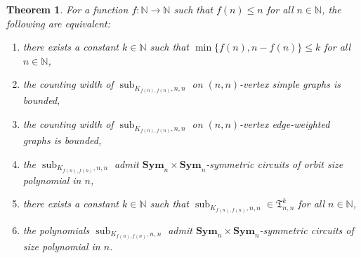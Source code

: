 \documentclass[10pt,a4paper]{article}
\theoremstyle{definition}
\theoremstyle{plain}
\newtheorem{theorem}[definition]{Theorem}
\theoremstyle{remark}
\DeclareMathOperator{\sub}{sub}
\newcommand{\Sym}{\mathbf{Sym}}
\begin{document}
	\begin{theorem}\label{thm:knn}
		For a function $f \colon \mathbb{N} \to \mathbb{N}$ such that $f(n) \leq n$ for all $n \in \mathbb{N}$,
		the following are equivalent:
		\begin{enumerate}
			\item there exists a constant $k \in \mathbb{N}$ such that $\min\{f(n), n- f(n)\} \leq k$ for all $n \in \mathbb{N}$,\label{it:knn1}
			\item the counting width of $\sub_{K_{f(n), f(n)}, n,n}$ on $(n,n)$-vertex simple graphs is bounded,\label{it:knn2}
			\item the counting width of $\sub_{K_{f(n), f(n)}, n,n}$ on $(n,n)$-vertex edge-weighted graphs is bounded,\label{it:knn3}
			\item the $\sub_{K_{f(n), f(n)}, n,n}$ admit $\Sym_n \times \Sym_n$-symmetric circuits of orbit size polynomial in $n$,\label{it:knn4}
			\item there exists a constant $k \in \mathbb{N}$ such that $\sub_{K_{f(n), f(n)}, n,n} \in \mathfrak{T}^k_{n,n}$ for all $n \in \mathbb{N}$,\label{it:knn5}
			\item the polynomials $\sub_{K_{f(n), f(n)}, n,n}$ admit $\Sym_n \times \Sym_n$-symmetric circuits of size polynomial in $n$.\label{it:knn6}
		\end{enumerate}
	\end{theorem}
\end{document}
